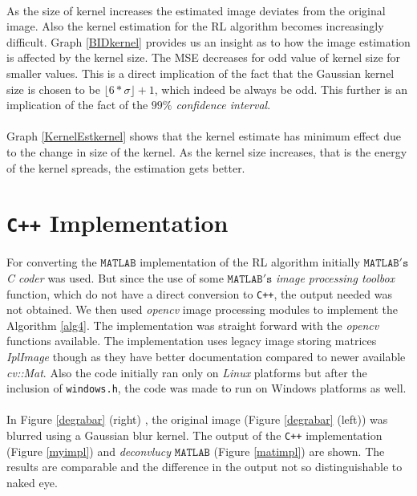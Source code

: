 \documentclass[a4paper]{book}
\begin{document}
\paragraph*{} As the size of kernel increases the estimated image deviates from the original image. Also the kernel estimation for the RL algorithm becomes increasingly difficult. Graph \ref{BIDkernel} provides us an insight as to how the image estimation is affected by the kernel size. The MSE decreases for odd value of kernel size for smaller values. This is a direct implication of the fact that the Gaussian kernel size is chosen to be $\lfloor6*\sigma\rfloor + 1$, which indeed be always be odd. This further is an implication of the fact of the \textit{$ 99\% $ confidence interval}.
\paragraph*{} Graph \ref{KernelEstkernel} shows that the kernel estimate has minimum effect due to the change in size of the kernel. As the kernel size increases, that is the energy of the kernel spreads, the estimation gets better.

\section{\Large \texttt{C++} Implementation}\label{secCpp}
For converting the $ \mathtt{MATLAB} $ implementation of the RL algorithm initially $ \mathtt{MATLAB's} $ \textit{C coder} was used. But since the use of some $ \mathtt{MATLAB's} $ \textit{image processing toolbox} function, which do not have a direct conversion to \texttt{C++}, the output needed was not obtained. 
We then used \textit{opencv} image processing modules to implement the Algorithm \ref{alg4}. The implementation was straight forward with the \textit{opencv} functions available. The implementation uses legacy image storing matrices \textit{IplImage} though as they have better documentation compared to newer available \textit{cv::Mat}. Also the code initially ran only on \textit{Linux} platforms but after the inclusion of \texttt{windows.h}, the code was made to run on Windows platforms as well.
\paragraph*{}In Figure \ref{degrabar} (right) , the original image (Figure \ref{degrabar} (left)) was blurred using a Gaussian blur kernel. The output of the \texttt{C++} implementation (Figure \ref{myimpl}) and \textit{deconvlucy} $ \mathtt{MATLAB} $ (Figure \ref{matimpl}) are shown. The results are comparable and the difference in the output not so distinguishable to naked eye.
\end{document}
